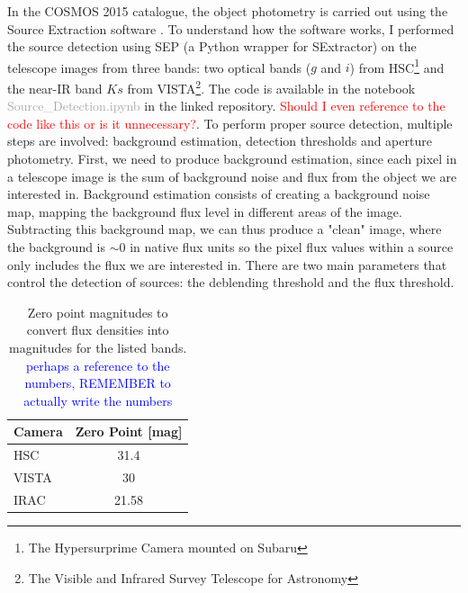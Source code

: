 In the COSMOS 2015 catalogue, the object photometry is carried out using the Source Extraction software  \cite[SExtractor,][]{SExtractor_1996}. To understand how the software works, I performed the source detection using SEP \cite{SEP_2018} (a Python wrapper for SExtractor) on the telescope images from three bands: two optical bands ($g$ and $i$) from HSC\footnote{The Hypersurprime Camera mounted on Subaru} and the near-IR band $Ks$ from VISTA\footnote{The Visible and Infrared Survey Telescope for Astronomy}. The code is available in the notebook \textcolor{darkgray}{Source\_Detection.ipynb} in the linked repository. \textcolor{red}{Should I even reference to the code like this or is it unnecessary?}. To perform proper source detection, multiple steps are involved: background estimation, detection thresholds and aperture photometry. First, we need to produce background estimation, since each pixel in a telescope image is the sum of background noise and flux from the object we are interested in. Background estimation consists of creating a background noise map, mapping the background flux level in different areas of the image. Subtracting this background map, we can thus produce a "clean" image, where the background is $\sim 0$ in native flux units so the pixel flux values within a source only includes the flux we are interested in. There are two main parameters that control the detection of sources: the deblending threshold and the flux threshold. 
\begin{table}
    \begin{tabular}{lc}
    \hline
    \textbf{Camera} & \textbf{Zero Point [mag]} \\ \hline
    HSC &  31.4 \\ \hline
    VISTA &  30 \\ \hline
    IRAC &  21.58 \\ \hline
    \end{tabular}
    \caption{Zero point magnitudes to convert flux densities into magnitudes for the listed bands. \textcolor{blue}{perhaps a reference to the numbers, REMEMBER to actually write the numbers}}
    \label{zero_point}
\end{table}
